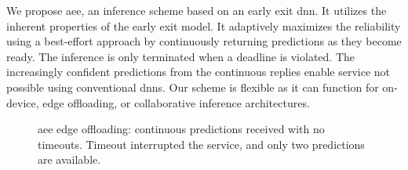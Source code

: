 We propose \acrfull{aee}, an inference scheme based on an early exit \gls{dnn}. It utilizes the inherent properties of the early exit model. It adaptively maximizes the reliability using a best-effort approach by continuously returning predictions as they become ready. The inference is only terminated when a deadline is violated. The increasingly confident predictions from the continuous replies enable service not possible using conventional \gls{dnn}s. Our scheme is flexible as it can function for on-device, edge offloading, or collaborative inference architectures. 
\begin{figure}
	\captionsetup[subfigure]{justification=centering}
	\centering
\end{figure}
\begin{figure}
	\captionsetup[subfigure]{justification=centering}
	\centering
	\caption[Offloading scheme]{\gls{aee} edge offloading: \protect{} continuous predictions received with no timeouts. \protect{} Timeout interrupted the service, and only two predictions are available. }
	\label{fig:offloading-scheme}
\end{figure} 

